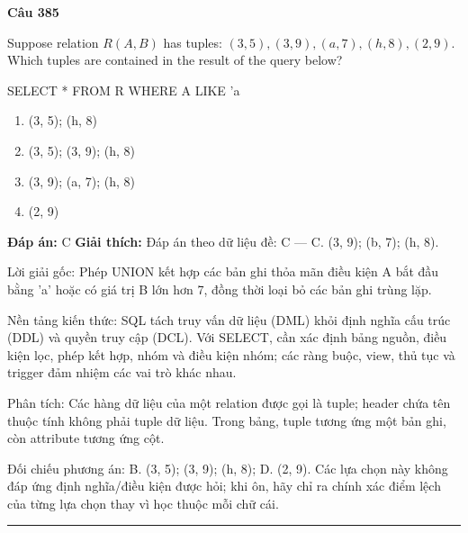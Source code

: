 \documentclass[11pt,a4paper]{article}
\newenvironment{question}[1]{%
  \par\vspace{1em}\noindent\textbf{\large Câu #1}\par\vspace{0.4em}
}{%
  \par\vspace{1em}\hrule\vspace{0.6em}
}
\newenvironment{choices}{%
  \begin{enumerate}[label=\textbf{\Alph*.},leftmargin=2.2em,itemsep=2pt,topsep=3pt]
}{%
  \end{enumerate}
}
\newcommand{\choice}{\item}
\newenvironment{codebox}{%
  \begin{tcolorbox}[colback=gray!8!white,colframe=gray!50!black,arc=1.5mm,boxrule=0.6pt,left=3mm,right=3mm,top=2.5mm,bottom=2.5mm]
  \ttfamily\small
}{%
  \end{tcolorbox}
}
\begin{document}
\begin{question}{385}
Suppose relation \(R(A, B)\) has tuples: \((3, 5), (3, 9), (a, 7), (h, 8), (2, 9)\). Which tuples are contained in the result of the query below?
\begin{codebox}
SELECT * FROM R WHERE A LIKE 'a%
\end{codebox}
\begin{choices}
\choice (3, 5); (h, 8)
\choice (3, 5); (3, 9); (h, 8)
\choice (3, 9); (a, 7); (h, 8)
\choice (2, 9)
\end{choices}
\textbf{Đáp án:} C
\textbf{Giải thích:} Đáp án theo dữ liệu đề: C — C. (3, 9); (b, 7); (h, 8).

Lời giải gốc: Phép UNION kết hợp các bản ghi thỏa mãn điều kiện A bắt đầu bằng 'a' hoặc có giá trị B lớn hơn 7, đồng thời loại bỏ các bản ghi trùng lặp.

Nền tảng kiến thức: SQL tách truy vấn dữ liệu (DML) khỏi định nghĩa cấu trúc (DDL) và quyền truy cập (DCL). Với SELECT, cần xác định bảng nguồn, điều kiện lọc, phép kết hợp, nhóm và điều kiện nhóm; các ràng buộc, view, thủ tục và trigger đảm nhiệm các vai trò khác nhau.

Phân tích: Các hàng dữ liệu của một relation được gọi là tuple; header chứa tên thuộc tính không phải tuple dữ liệu. Trong bảng, tuple tương ứng một bản ghi, còn attribute tương ứng cột.

Đối chiếu phương án: B. (3, 5); (3, 9); (h, 8); D. (2, 9). Các lựa chọn này không đáp ứng định nghĩa/điều kiện được hỏi; khi ôn, hãy chỉ ra chính xác điểm lệch của từng lựa chọn thay vì học thuộc mỗi chữ cái.
\end{question}
\end{document}
